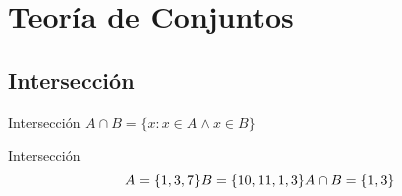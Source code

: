 
\section{Teoría de Conjuntos}

\lipsum[2-3]

\subsection{Intersección}

\lipsum[2-3]

\separation
\begin{definitionblock}{Intersección}
    $A \cap B = \{x : x \in A \wedge x \in B \}$
\end{definitionblock}

\separation
\lipsum[2-3]

\separation
\begin{exampleblock}{Intersección}
    \begin{equation*}
        A = \{1,3,7\} \\
        B = \{10,11,1,3\} \\
        A \cap B = \{1,3\}
    \end{equation*}
\end{exampleblock}
